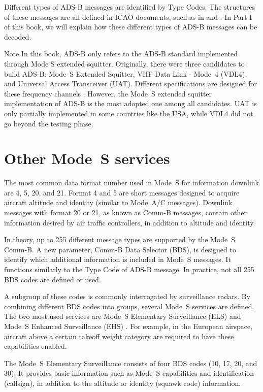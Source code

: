 Different types of ADS-B messages are identified by Type Codes. The structures of these messages are all defined in ICAO documents, such as in \cite{icao9871v1} and \cite{rtca2011mops}. In Part I of this book, we will explain how these different types of ADS-B messages can be decoded.

\begin{notebox}{Note}
  In this book, ADS-B only refers to the ADS-B standard implemented through Mode S extended squitter. Originally, there were three candidates to build ADS-B: Mode~S Extended Squitter, VHF Data Link - Mode~4 (VDL4), and Universal Access Transceiver (UAT). Different specifications are designed for these frequency channels \cite{rtca2011mops, rtca2002uat}. However, the Mode~S extended squitter implementation of ADS-B is the most adopted one among all candidates. UAT is only partially implemented in some countries like the USA, while VDL4 did not go beyond the testing phase.
\end{notebox}


\section{Other Mode~S services}

The most common data format number used in Mode~S for information downlink are 4, 5, 20, and 21. Format 4 and 5 are short messages designed to acquire aircraft altitude and identity (similar to Mode~A/C messages). Downlink messages with format 20 or 21, as known as Comm-B messages, contain other information desired by air traffic controllers, in addition to altitude and identity.

In theory, up to 255 different message types are supported by the Mode~S Comm-B. A new parameter, Comm-B Data Selector (BDS), is designed to identify which additional information is included in Mode~S messages. It functions similarly to the Type Code of ADS-B message. In practice, not all 255 BDS codes are defined or used. 

A subgroup of these codes is commonly interrogated by surveillance radars. By combining different BDS codes into groups, several Mode~S services are defined. The two most used services are Mode~S Elementary Surveillance (ELS) and Mode~S Enhanced Surveillance (EHS) \cite{grappel2008}. For example, in the European airspace, aircraft above a certain takeoff weight category are required to have these capabilities enabled.

The Mode~S Elementary Surveillance consists of four BDS codes (10, 17, 20, and 30). It provides basic information such as Mode~S capabilities and identification (callsign), in addition to the altitude or identity (squawk code) information. 

